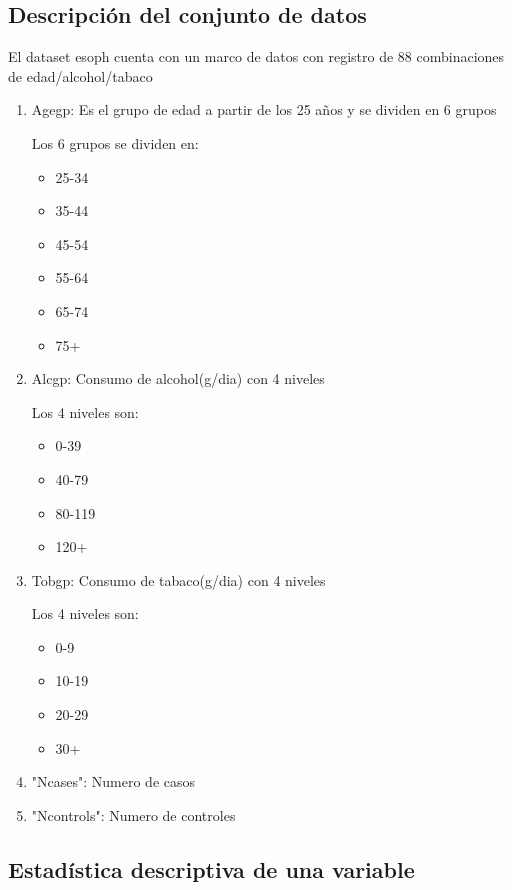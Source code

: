 \documentclass[12pt,a4paper]{article}
\begin{document}
\subsection{Descripción del conjunto de datos} \label{subsec:descripcion}
El dataset esoph cuenta con un marco de datos con registro de 88 combinaciones de edad/alcohol/tabaco
\begin{enumerate}
  \item Agegp: Es el grupo de edad a partir de los 25 años y se dividen en 6 grupos
	\par Los 6 grupos se dividen en:     
     \begin{itemize}
		\addtolength{\itemsep}{-1mm}
		\item 25-34
		\item 35-44
		\item 45-54
		\item 55-64
		\item 65-74
		\item 75+
	 \end{itemize}
  \item Alcgp: Consumo de alcohol(g/dia) con 4 niveles
  	\par Los 4 niveles son:     
     \begin{itemize}
		\addtolength{\itemsep}{-1mm}
		\item 0-39
		\item 40-79
		\item 80-119
		\item 120+
	 \end{itemize}
  \item Tobgp: Consumo de tabaco(g/dia) con 4 niveles
  	\par Los 4 niveles son:     
     \begin{itemize}
		\addtolength{\itemsep}{-1mm}
		\item 0-9
		\item 10-19
		\item 20-29
		\item 30+
	 \end{itemize}
  \item "Ncases": Numero de casos
  \item "Ncontrols": Numero de controles 
\end{enumerate}


\subsection{Estadística descriptiva de una variable} \label{subsec:estadisticadescriptivauna}
\end{document}
